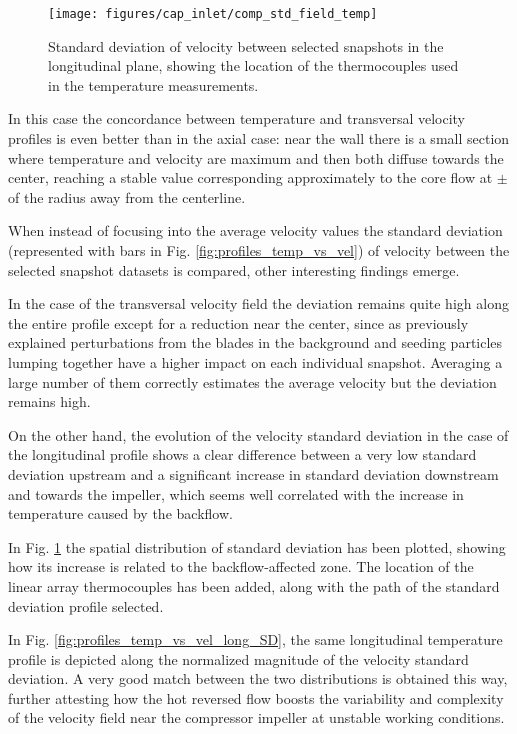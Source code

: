 \begin{figure}[t!]
\centering
\texttt{[image: figures/cap\_inlet/comp\_std\_field\_temp]}
\caption{Standard deviation of velocity between selected snapshots in the longitudinal plane, showing the location of the thermocouples used in the temperature measurements.}
\label{fig:comp_std_field_temp}
\end{figure}

In this case the concordance between temperature and transversal velocity profiles is even better than in the axial case: near the wall there is a small section where temperature and velocity are maximum and then both diffuse towards the center, reaching a stable value corresponding approximately to the core flow at $\pm$ of the radius away from the centerline.

When instead of focusing into the average velocity values the standard deviation (represented with bars in Fig. \ref{fig:profiles_temp_vs_vel}) of velocity between the selected snapshot datasets is compared, other interesting findings emerge.

In the case of the transversal velocity field the deviation remains quite high along the entire profile except for a reduction near the center, since as previously explained perturbations from the blades in the background and seeding particles lumping together have a higher impact on each individual snapshot. Averaging a large number of them correctly estimates the average velocity but the deviation remains high.

On the other hand, the evolution of the velocity standard deviation in the case of the longitudinal profile shows a clear difference between a very low standard deviation upstream and a significant increase in standard deviation downstream and towards the impeller, which seems well correlated with the increase in temperature caused by the backflow.

In Fig. \ref{fig:comp_std_field_temp} the spatial distribution of standard deviation has been plotted, showing how its increase is related to the backflow-affected zone. The location of the linear array thermocouples has been added, along with the path of the standard deviation profile selected.

In Fig. \ref{fig:profiles_temp_vs_vel_long_SD}, the same longitudinal temperature profile is depicted along the normalized magnitude of the velocity standard deviation. A very good match between the two distributions is obtained this way, further attesting how the hot reversed flow boosts the variability and complexity of the velocity field near the compressor impeller at unstable working conditions.

